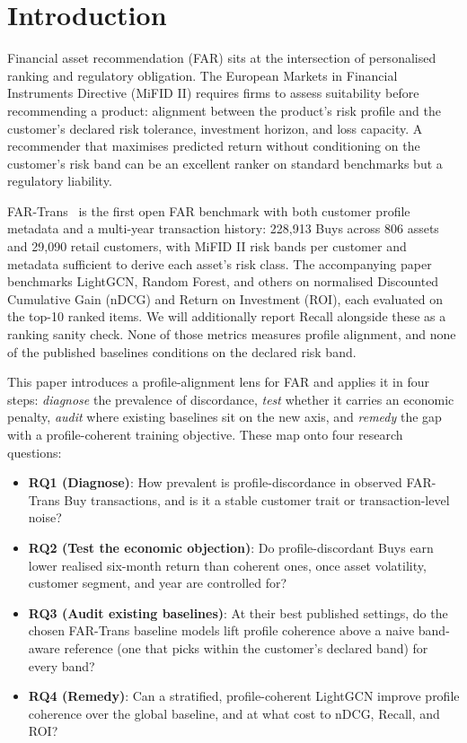 \section{Introduction}
\label{sec:intro}

Financial asset recommendation (FAR) sits at the intersection of personalised ranking and regulatory obligation. The European Markets in Financial Instruments Directive (MiFID II) requires firms to assess suitability before recommending a product: alignment between the product's risk profile and the customer's declared risk tolerance, investment horizon, and loss capacity. A recommender that maximises predicted return without conditioning on the customer's risk band can be an excellent ranker on standard benchmarks but a regulatory liability.

FAR-Trans~\cite{sanzcruzado:fartrans} is the first open FAR benchmark with both customer profile metadata and a multi-year transaction history: 228{,}913 Buys across 806 assets and 29{,}090 retail customers, with MiFID II risk bands per customer and metadata sufficient to derive each asset's risk class. The accompanying paper benchmarks LightGCN, Random Forest, and others on normalised Discounted Cumulative Gain (nDCG) and Return on Investment (ROI), each evaluated on the top-10 ranked items. We will additionally report Recall alongside these as a ranking sanity check. None of those metrics measures profile alignment, and none of the published baselines conditions on the declared risk band.

This paper introduces a profile-alignment lens for FAR and applies it in four steps: \emph{diagnose} the prevalence of discordance, \emph{test} whether it carries an economic penalty, \emph{audit} where existing baselines sit on the new axis, and \emph{remedy} the gap with a profile-coherent training objective. These map onto four research questions:

\begin{itemize}
    \item \textbf{RQ1 (Diagnose)}: How prevalent is profile-discordance in observed FAR-Trans Buy transactions, and is it a stable customer trait or transaction-level noise?
    \item \textbf{RQ2 (Test the economic objection)}: Do profile-discordant Buys earn lower realised six-month return than coherent ones, once asset volatility, customer segment, and year are controlled for?
    \item \textbf{RQ3 (Audit existing baselines)}: At their best published settings, do the chosen FAR-Trans baseline models lift profile coherence above a naive band-aware reference (one that picks within the customer's declared band) for every band?
    \item \textbf{RQ4 (Remedy)}: Can a stratified, profile-coherent LightGCN improve profile coherence over the global baseline, and at what cost to nDCG, Recall, and ROI?
\end{itemize}

